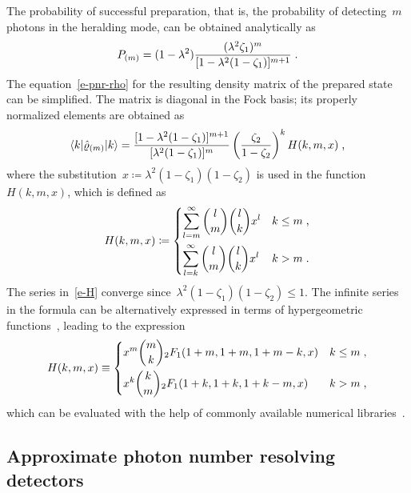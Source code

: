 \documentclass{article}
\begin{document}
The probability of successful preparation, that is, the probability of detecting~$m$ photons in the heralding mode, can be obtained analytically as
%
\begin{equation}\label{e-pnr-pro}
  P_{(m)} = (1 - \lambda^{2}) 
  \frac
    { (\lambda^{2} \zeta_{1})^{m} }
    { [ 1 - \lambda^{2} (1 - \zeta_{1}) ]^{m + 1} } \;\text{.}
\end{equation}
%
The equation~\eqref{e-pnr-rho} for the resulting density matrix of the prepared state can be simplified. The matrix is diagonal in the Fock basis; its properly normalized elements are obtained as
%
\begin{equation}\label{e-pnr-rho-kk}
  \braket{ k | \hat{\varrho}_{(m)} | k } =
  \frac
    { [ 1 - \lambda^{2} (1 - \zeta_{1}) ]^{m + 1} }
    { [ \lambda^{2} (1 - \zeta_{1}) ]^{m} }
  \left( \frac{ \zeta_{2} }{ 1 - \zeta_{2} } \right)^{k}
  H (k, m, x) \;\text{,}
\end{equation}
%
where the substitution~${x \coloneqq \lambda^{2} ( 1 - \zeta_{1} )(1 - \zeta_{2} )}$ is used in the function~$H(k, m, x)$, which is defined as
%
\begin{equation}\label{e-H}
  H(k, m, x) \coloneq
  \begin{dcases}
    \sum_{l = m}^{\infty}
      \binom{l}{m}
      \binom{l}{k}
      x^{l} 
    & k \leq m \;\text{,} \\
    \sum_{l = k}^{\infty}
      \binom{l}{m}
      \binom{l}{k}
      x^{l}
    & k > m \;\text{.}
  \end{dcases}
\end{equation}
%
The series in~\eqref{e-H} converge since~${\lambda^{2} ( 1 - \zeta_{1} )(1 - \zeta_{2} ) \leq 1}$. The infinite series in the formula can be alternatively expressed in terms of hypergeometric functions~\cite{bateman1981}, leading to the expression
%
\begin{equation}
  H(k, m, x) \equiv
  \begin{dcases}
    x^{m} \binom{m}{k} {}_{2}F_{1} (1 + m, 1 + m, 1 + m - k, x)
    & k \leq m \;\text{,} \\
    x^{k} \binom{k}{m} {}_{2}F_{1} (1 + k, 1 + k, 1 + k - m, x)
    & k > m \;\text{,}
  \end{dcases}
\end{equation}
%
which can be evaluated with the help of commonly available numerical libraries~\cite{virtanen2020}.

\subsection*{Approximate photon number resolving detectors}
\end{document}
